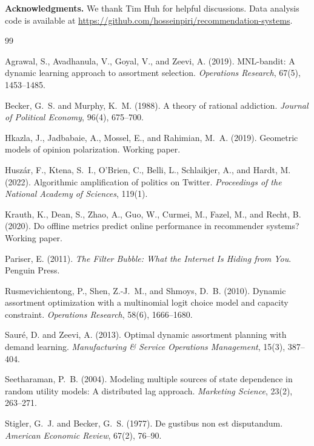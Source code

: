 \documentclass[11pt]{article}
\begin{document}
\bigskip

\noindent\textbf{Acknowledgments.} We thank Tim Huh for helpful discussions. Data analysis code is available at \url{https://github.com/hosseinpiri/recommendation-systems}.

\begin{thebibliography}{99}

Agrawal, S., Avadhanula, V., Goyal, V., and Zeevi, A. (2019).
MNL-bandit: A dynamic learning approach to assortment selection.
\textit{Operations Research}, 67(5), 1453--1485.

Becker, G.~S. and Murphy, K.~M. (1988).
A theory of rational addiction.
\textit{Journal of Political Economy}, 96(4), 675--700.

Hkazla, J., Jadbabaie, A., Mossel, E., and Rahimian, M.~A. (2019).
Geometric models of opinion polarization.
Working paper.

Husz{\'a}r, F., Ktena, S.~I., O'Brien, C., Belli, L., Schlaikjer, A., and Hardt, M. (2022).
Algorithmic amplification of politics on Twitter.
\textit{Proceedings of the National Academy of Sciences}, 119(1).

Krauth, K., Dean, S., Zhao, A., Guo, W., Curmei, M., Fazel, M., and Recht, B. (2020).
Do offline metrics predict online performance in recommender systems?
Working paper.

Pariser, E. (2011).
\textit{The Filter Bubble: What the Internet Is Hiding from You}.
Penguin Press.

Rusmevichientong, P., Shen, Z.-J.~M., and Shmoys, D.~B. (2010).
Dynamic assortment optimization with a multinomial logit choice model and capacity constraint.
\textit{Operations Research}, 58(6), 1666--1680.

Saur{\'e}, D. and Zeevi, A. (2013).
Optimal dynamic assortment planning with demand learning.
\textit{Manufacturing \& Service Operations Management}, 15(3), 387--404.

Seetharaman, P.~B. (2004).
Modeling multiple sources of state dependence in random utility models: A distributed lag approach.
\textit{Marketing Science}, 23(2), 263--271.

Stigler, G.~J. and Becker, G.~S. (1977).
De gustibus non est disputandum.
\textit{American Economic Review}, 67(2), 76--90.

\end{thebibliography}
\end{document}
